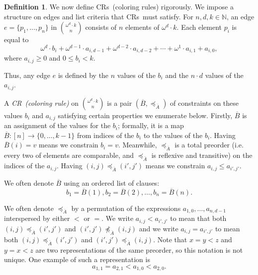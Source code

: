\documentclass[11pt]{article}
\newcommand{\om}{\omega}
\newcommand{\N}{\mathbb{N}}
\newcommand{\crulenospace}{CR}
\newcommand{\cruleLong}{coloring rule}
\newcommand{\crulesLong}{coloring rules}
\newcommand{\crule}{\crulenospace~}
\newcommand{\crules}{\crulenospace s~}
\newcommand{\xleq}{\preceq_{\overline{A}}}
\newcommand{\assny}{\overline{B}}
\newcommand{\numpoints}{n}
\newcommand{\inumpoints}{i}
\newcommand{\idegr}{j}
\newcommand{\commonconst}{a}
\newcommand{\rareconst}{b}
\theoremstyle{plain}
\theoremstyle{definition}
\newtheorem{definition}[theorem]{Definition}
\begin{document}
\begin{definition}\label{def:coloring-rule}
We now define \crules (\crulesLong) rigorously. We impose a structure on edges and list criteria that \crules must satisfy.
For $\numpoints,d,k \in \N$, an edge $e = \{p_1, \dots, p_{\numpoints}\}$ in $\binom{\om^d \cdot k}{\numpoints}$ consists of $\numpoints$ elements of $\om^d\cdot k$. Each element $p_{\inumpoints} $ is equal to 
$$\om^d \cdot \rareconst_{\inumpoints} + \om^{d-1} \cdot \commonconst_{\inumpoints,d-1} + \om^{d-2} \cdot \commonconst_{\inumpoints,d-2} + \cdots + \om^1 \cdot \commonconst_{\inumpoints,1} + \commonconst_{\inumpoints,0},$$
where $\commonconst_{\inumpoints,\idegr} \geq 0$ and $0\leq \rareconst_{\inumpoints} < k$.

Thus, any edge $e$ is defined by the $\numpoints$ values of the $\rareconst_{\inumpoints}$ and the $\numpoints\cdot d$ values of the $\commonconst_{\inumpoints,\idegr}$. 

A \textit{\crule (\cruleLong)} on $\binom{\om^d \cdot k}{\numpoints}$ is a pair $(\assny,\xleq)$ of constraints on these values $\rareconst_{\inumpoints}$ and $\commonconst_{\inumpoints,\idegr}$ satisfying certain properties we enumerate below. Firstly, $\assny$ is an assignment of the values for the $\rareconst_{\inumpoints}$; formally, it is a map $\assny: [\numpoints] \to \{0,\dots,k-1\}$ from indices of the $\rareconst_{\inumpoints}$ to the values of the $\rareconst_{\inumpoints}$. Having $\assny(\inumpoints) = v$ means we constrain $\rareconst_{\inumpoints} = v$.
Meanwhile, $\xleq$ is a total preorder (i.e. every two of elements are comparable, and $\xleq$ is reflexive and transitive) on the indices of the $\commonconst_{\inumpoints,\idegr}$. Having $(\inumpoints,\idegr) \xleq (\inumpoints',\idegr')$ means we constrain $\commonconst_{\inumpoints,\idegr} \leq \commonconst_{\inumpoints',\idegr'}$.

We often denote $\assny$ using an ordered list of clauses: $$\rareconst_1 = \assny(1), \rareconst_2 = \assny(2), \dots, \rareconst_{\numpoints} = \assny(\numpoints).$$

We often denote $\xleq$ by a permutation of the expressions $\commonconst_{1,0}, \dots, \commonconst_{\numpoints,d-1}$ interspersed by either $<$ or $=$. We write $\commonconst_{\inumpoints,\idegr} < \commonconst_{\inumpoints',\idegr'}$ to mean that both $(\inumpoints,\idegr) 
\xleq (\inumpoints',\idegr')$ and $(\inumpoints',\idegr') 
\not \xleq (\inumpoints,\idegr)$ and we write $\commonconst_{\inumpoints,\idegr} = \commonconst_{\inumpoints',\idegr'}$ to mean both $(\inumpoints,\idegr) 
\xleq (\inumpoints',\idegr')$ and $(\inumpoints',\idegr') 
\xleq (\inumpoints,\idegr)$. Note that $x = y < z$ and $y = x < z$ are two representations of the same preorder, so this notation is not unique. One example of such a representation is $$
\commonconst_{1, 1} = \commonconst_{2, 1} < \commonconst_{1 ,0} < \commonconst_{2 ,0}.
$$


\end{definition}
\end{document}
